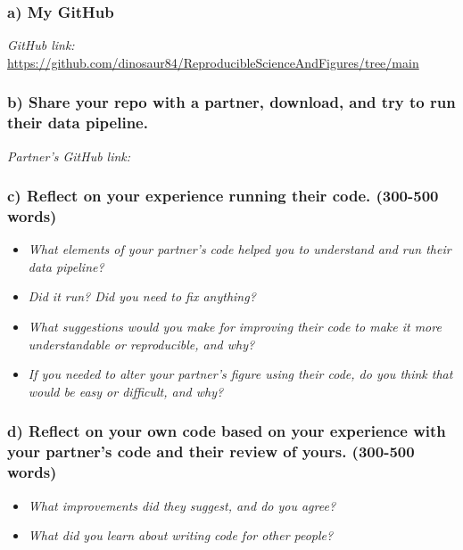 \documentclass[
]{article}
\begin{document}
\subsubsection{a) My GitHub}\label{a-my-github}

\emph{GitHub link:}
\url{https://github.com/dinosaur84/ReproducibleScienceAndFigures/tree/main}

\subsubsection{b) Share your repo with a partner, download, and try to
run their data
pipeline.}\label{b-share-your-repo-with-a-partner-download-and-try-to-run-their-data-pipeline.}

\emph{Partner's GitHub link:}

\subsubsection{c) Reflect on your experience running their code.
(300-500
words)}\label{c-reflect-on-your-experience-running-their-code.-300-500-words}

\begin{itemize}
\item
  \emph{What elements of your partner's code helped you to understand
  and run their data pipeline?}
\item
  \emph{Did it run? Did you need to fix anything?}
\item
  \emph{What suggestions would you make for improving their code to make
  it more understandable or reproducible, and why?}
\item
  \emph{If you needed to alter your partner's figure using their code,
  do you think that would be easy or difficult, and why?}
\end{itemize}

\subsubsection{d) Reflect on your own code based on your experience with
your partner's code and their review of yours. (300-500
words)}\label{d-reflect-on-your-own-code-based-on-your-experience-with-your-partners-code-and-their-review-of-yours.-300-500-words}

\begin{itemize}
\item
  \emph{What improvements did they suggest, and do you agree?}
\item
  \emph{What did you learn about writing code for other people?}
\end{itemize}
\end{document}
